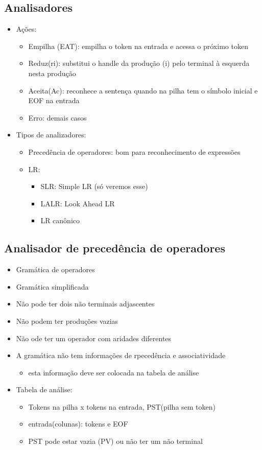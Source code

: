 \documentclass[11pt]{article}
\begin{document}
\subsection{Analisadores}
\label{sec:org8db703a}
\begin{itemize}
\item Ações:
\begin{itemize}
\item Empilha (EAT): empilha o token na entrada e acessa o próximo
token
\item Reduz(ri): substitui o handle da produção (i) pelo terminal à
esquerda nesta produção
\item Aceita(Ac): reconhece a sentença quando na pilha tem o símbolo
inicial e EOF na entrada
\item Erro: demais casos
\end{itemize}
\item Tipos de analizadores:
\begin{itemize}
\item Precedência de operadores: bom para reconhecimento de
expressões
\item LR:
\begin{itemize}
\item SLR: Simple LR (só veremos esse)
\item LALR: Look Ahead LR
\item LR canônico
\end{itemize}
\end{itemize}
\end{itemize}
\subsection{Analisador de precedência de operadores}
\label{sec:orgb286ed0}
\begin{itemize}
\item Gramática de operadores
\item Gramática simplificada
\item Não pode ter dois não terminais adjascentes
\item Não podem ter produções vazias
\item Não ode ter um operador com aridades diferentes
\item A gramática não tem informações de rpecedência e associatividade
\begin{itemize}
\item esta informação deve ser colocada na tabela de análise
\end{itemize}
\item Tabela de análise:
\begin{itemize}
\item Tokens na pilha x tokens na entrada, PST(pilha sem token)
\item entrada(colunas): tokens e EOF
\item PST pode estar vazia (PV) ou não ter um não terminal
\end{itemize}
\end{itemize}
\end{document}
